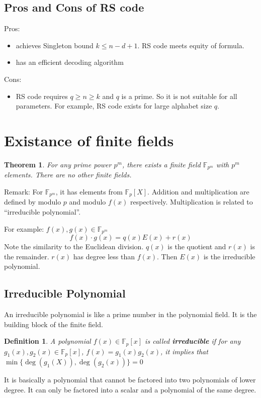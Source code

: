 \documentclass[letterpaper,12pt]{article}
\newtheorem{theorem}{Theorem}
\newtheorem{definition}{Definition}
\begin{document}
\subsection{Pros and Cons of RS code}
Pros: \begin{itemize}
    \item achieves Singleton bound $k\le n-d+1$. RS code meets equity of formula.
    \item has an efficient decoding algorithm
\end{itemize}
Cons: \begin{itemize}
    \item RS code requires $q\ge n \ge k$ and $q$ is a prime. So it is not suitable for
          all parameters. For example, RS code exists for large alphabet size $q$.
\end{itemize}

\section{Existance of finite fields}
\begin{theorem}
    For any prime power $p^m$, there exists a finite field $\mathbb{F}_{p^m}$ with $p^m$ elements. There are no other finite fields.
\end{theorem}
Remark: For $\mathbb{F}_{p^m}$, it has elements from $\mathbb{F}_p [X]$. Addition and multiplication are defined by modulo $p$ and modulo $f(x)$ respectively. Multiplication is related to ``irreducible polynomial''.

For example: $f(x),g(x)\in \mathbb{F}_{p^m}$\[
    f(x)\cdot g(x) = q(x)E(x)+r(x)
\]
Note the similarity to the Euclidean division. $q(x)$ is the quotient and
$r(x)$ is the remainder. $r(x)$ has degree less than $f(x)$. Then $E(x)$ is the
irreducible polynomial.
\subsection{Irreducible Polynomial}
An irreducible polynomial is like a prime number in the polynomial field. It is
the building block of the finite field.
\begin{definition}
    A polynomial $f(x)\in \mathbb{F}_p[x]$ is called \textbf{irreducible} if for any $g_1(x),g_2(x)\in \mathbb{F}_p[x]$, $f(x)= g_1(x)g_2(x)$, it implies that $\min\{\deg(g_1(X)),\deg(g_2(x))\}=0$
\end{definition}
It is basically a polynomial that cannot be factored into two polynomials of lower degree. It can only be factored into a scalar and a polynomial of the same degree.
\end{document}
